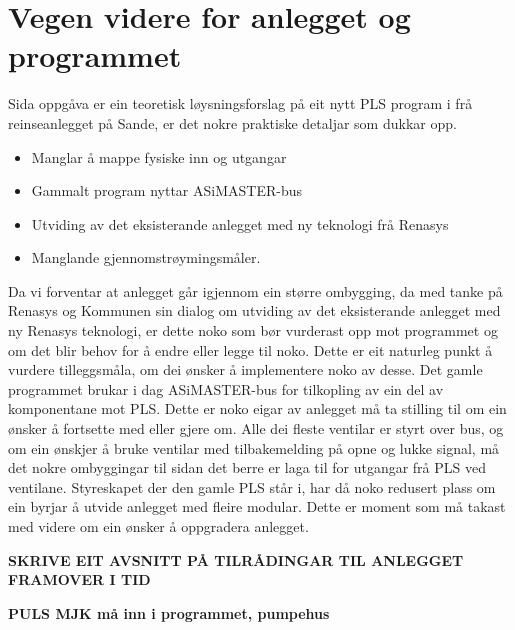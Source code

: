 \section{Vegen videre for anlegget og programmet}
\thispagestyle{fancy}

Sida oppgåva er ein teoretisk løysningsforslag på eit nytt PLS program i frå reinseanlegget på Sande, er det nokre praktiske detaljar som dukkar opp.

\begin{itemize}
    \item Manglar å mappe fysiske inn og utgangar
    \item Gammalt program nyttar ASiMASTER-bus  
    \item Utviding av det eksisterande anlegget med ny teknologi frå Renasys
    \item Manglande gjennomstrøymingsmåler.
\end{itemize}

Da vi forventar at anlegget går igjennom ein større ombygging,  da med tanke på Renasys og Kommunen sin dialog om utviding av det eksisterande anlegget med ny Renasys teknologi, er dette noko som bør vurderast opp mot programmet og om det blir behov for å endre eller legge til noko. 
Dette er eit naturleg punkt å vurdere tilleggsmåla, om dei ønsker å implementere noko av desse.
Det gamle programmet brukar i dag ASiMASTER-bus for tilkopling av ein del av komponentane mot PLS. 
Dette er noko eigar av anlegget må ta stilling til om ein ønsker å fortsette med eller gjere om. Alle dei fleste ventilar er styrt over bus, og om ein ønskjer å bruke ventilar med tilbakemelding på opne og lukke signal, må det nokre ombyggingar til sidan det berre er laga til for utgangar frå PLS ved ventilane.
Styreskapet der den gamle PLS står i, har då noko redusert plass om ein byrjar å utvide anlegget med fleire modular. 
Dette er moment som må takast med videre om ein ønsker å oppgradera anlegget. 

\textbf{SKRIVE EIT AVSNITT PÅ TILRÅDINGAR TIL ANLEGGET FRAMOVER I TID}

\textbf{PULS MJK må inn i programmet, pumpehus}